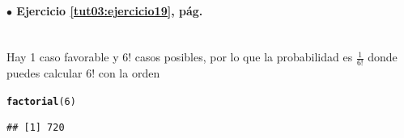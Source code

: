 \documentclass[10pt,a4paper]{article}\usepackage[]{graphicx}\usepackage[]{color}
\makeatletter
\newcommand{\hlnum}[1]{\textcolor[rgb]{0.686,0.059,0.569}{#1}}%
\newcommand{\hlstd}[1]{\textcolor[rgb]{0.345,0.345,0.345}{#1}}%
\newcommand{\hlkwd}[1]{\textcolor[rgb]{0.737,0.353,0.396}{\textbf{#1}}}%
\newenvironment{kframe}{%
 \def\at@end@of@kframe{}%
 \ifinner\ifhmode%
  \def\at@end@of@kframe{\end{minipage}}%
  \begin{minipage}{\columnwidth}%
 \fi\fi%
 \def\FrameCommand##1{\hskip\@totalleftmargin \hskip-\fboxsep
 \colorbox{shadecolor}{##1}\hskip-\fboxsep
     \hskip-\linewidth \hskip-\@totalleftmargin \hskip\columnwidth}%
 \MakeFramed {\advance\hsize-\width
   \@totalleftmargin\z@ \linewidth\hsize
   \@setminipage}}%
 {\par\unskip\endMakeFramed%
 \at@end@of@kframe}
\newenvironment{knitrout}{}{} %
\makeatother
\begin{document}
\paragraph{\bf $\bullet$ 
                Ejercicio \ref{tut03:ejercicio19}, pág. 
           \pageref{tut03:ejercicio19}}
\label{tut03:ejercicio19:sol}\quad\\
Hay 1 caso favorable y $6!$ casos posibles, por lo que la probabilidad es $\frac{1}{6!}$ donde puedes calcular $6!$ con la orden
\begin{knitrout}
\color{fgcolor}\begin{kframe}
\begin{alltt}
     \hlkwd{factorial}\hlstd{(}\hlnum{6}\hlstd{)}
\end{alltt}
\begin{verbatim}
## [1] 720
\end{verbatim}
\end{kframe}
\end{knitrout}
     
\end{document}
